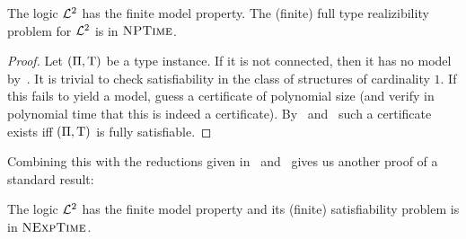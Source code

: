 \begin{proposition}
The logic $\mathcal{L}^{2}$ has the finite model property. The (finite) full type
realizibility problem for $\mathcal{L}^{2}$ is in $\text{\normalfont{\scshape NPTime}}$.
\end{proposition}
\begin{proof}
Let $(\Pi,\mathrm{T})$ be a type instance. If it is not connected, then it has no
model by~. It is trivial to check satisfiability in
the class of structures of cardinality $1$. If this fails to yield a model,
guess a certificate of polynomial size (and verify in polynomial time that this
is indeed a certificate).
By~ and~ such a certificate exists
iff $(\Pi,\mathrm{T})$ is fully satisfiable.
\end{proof}
Combining this with the reductions given in~
and~ gives us another proof of a standard result:
\begin{corollary}
The logic $\mathcal{L}^{2}$ has the finite model property and its (finite) satisfiability
problem is in $\text{\normalfont{\scshape NExpTime}}$.
\end{corollary}